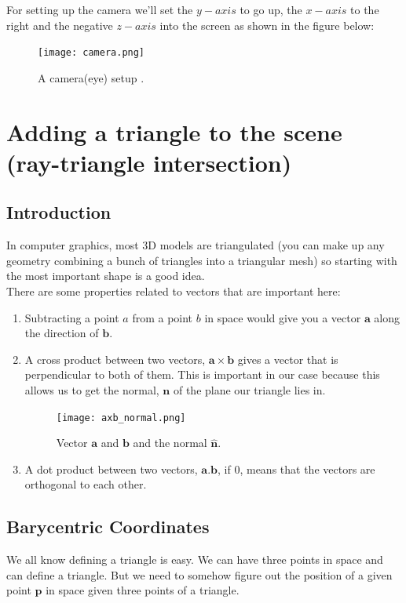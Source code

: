 \documentclass[11pt,a4paper]{article}
\begin{document}
	\noindent
	For setting up the camera we'll set the $y-axis$ to go up, the $x-axis$ to the right and the negative $z-axis$ into the screen as shown in the figure below:
	\begin{figure}[H]
		\centering
		\texttt{[image: camera.png]}
		\caption{\centering A camera(eye) setup \protect\cite{Shirley2020RTW1}.}
	\end{figure}
	
	\section{Adding a triangle to the scene (ray-triangle intersection)}
	\subsection{Introduction}
	In computer graphics, most 3D models are triangulated (you can make up any geometry combining a bunch of triangles into a triangular mesh) so starting with the most important shape is a good idea.\\
	
	There are some properties related to vectors that are important here:
	\begin{enumerate}
		\item Subtracting a point $a$ from a point $b$ in space would give you a vector $\boldsymbol{a}$ along the direction of $\boldsymbol{b}$.
		\item A cross product between two vectors, $\boldsymbol{a} \times \boldsymbol{b}$  gives a vector that is perpendicular to both of them. This is important in our case because this allows us to get the normal, $\boldsymbol{n}$ of the plane our triangle lies in.
		\begin{figure}[H]
			\centering
			\texttt{[image: axb\_normal.png]}
			\caption{\centering Vector $\boldsymbol{a}$ and $\boldsymbol{b}$ and the normal $\boldsymbol{\hat{n}}$.}
		\end{figure}
		\item A dot product between two vectors, $\boldsymbol{a}.\boldsymbol{b}$, if $0$, means that the vectors are orthogonal to each other.
	\end{enumerate}	
	
	\subsection{Barycentric Coordinates}
	We all know defining a triangle is easy. We can have three points in space and can define a triangle. But we need to somehow figure out the position of a given point $\boldsymbol{p}$ in space given three points of a triangle.
	
\end{document}
